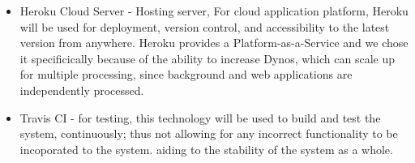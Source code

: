\documentclass{article}
\begin{document}
\begin{itemize}
	 	
	 	\item Heroku Cloud Server - Hosting server, For cloud application platform, Heroku will be used for deployment, version control, and accessibility to the latest version from anywhere. Heroku provides a Platform-as-a-Service and we chose it specificically because of the ability to increase Dynos, which can scale up for multiple processing, since background and web applications are independently processed.
	 	
	 	\item Travis CI - for testing, this technology will be used to build and test the system, continuously; thus not allowing for any incorrect functionality to be incoporated to the system. aiding to the stability of the system as a whole.   
	 	
	 \end{itemize}
	 
	
	
	
	
\end{document}
